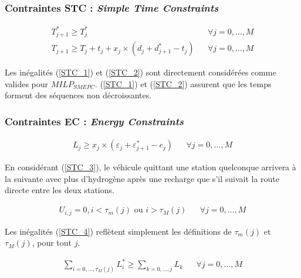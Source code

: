 \subsubsection{Contraintes STC : \textit{Simple Time Constraints}}

\begin{subequations}
\begin{align}
\label{STC_1}	T_{j+1}^* \geq T_{j}^* &  &\forall j= 0, \dots, M \\ 
\label{STC_2}	T_{j+1} \geq T_{j}+t_j+x_j \times (d_j+d_{j+1}^*-t_j) &  &\forall j= 0, \dots, M 
\end{align}
\end{subequations}

Les inégalités (\ref{STC_1}) et (\ref{STC_2}) sont directement considérées comme valides pour \textit{$MILP_{SMEPC}$}. (\ref{STC_1}) et (\ref{STC_2}) assurent que les temps forment des séquences non décroissantes.

\subsubsection{Contraintes EC : \textit{Energy Constraints}} 

\begin{equation}
\begin{align}
\label{STC_3} L_j \geq x_j \times (\varepsilon_j + \varepsilon_{j+1}^* - e_j) &  &\forall j= 0, \dots, M 
\end{align}
\end{equation}

En considérant (\ref{STC_3}), le véhicule quittant une station quelconque arrivera à la suivante avec plus d'hydrogène après une recharge que s'il suivait la route directe entre les deux stations.

\begin{equation}
\begin{align}
\label{STC_4} U_{i,j} = 0, i < \tau_m(j) \text{ ou } i > \tau_M(j) &  &\forall j= 0, \dots, M 
\end{align}
\end{equation}

Les inégalités (\ref{STC_4}) reflètent simplement les définitions de $\tau_m(j)$ et $\tau_M(j)$, pour tout $j$.

\begin{equation}
\begin{align}
\label{STC_5}
\sum_{i=0, \dots, \tau_M(j)}L_i^* \geq \sum_{k=0, \dots, j }L_k  &  &\forall j= 0, \dots, M 
\end{align}
\end{equation}

